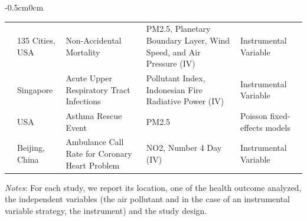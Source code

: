 \begin{table}[]
\begin{adjustwidth}{-0.5cm}{0cm}
\begin{threeparttable}
\begin{tabular}{p{2.5cm}p{3cm}p{7cm}p{7cm}p{4cm}}
\cite{schwartz_national_2018}      & 135 Cities, USA             & Non-Accidental Mortality                                    & PM2.5, Planetary Boundary Layer, Wind Speed, and Air Pressure (IV) & Instrumental Variable                             \\
\rowcolor{Gray}
\cite{sheldon_impact_2017}     & Singapore                   & Acute Upper Respiratory Tract Infections                    & Pollutant Index, Indonesian Fire Radiative Power (IV)                              & Instrumental Variable                             \\
\cite{williams_short-term_2019}       & USA                         & Asthma Rescue Event                                         & PM2.5                                                             & Poisson fixed-effects models                      \\
\rowcolor{Gray}
\cite{zhong2017traffic}         & Beijing, China              & Ambulance Call Rate for Coronary Heart Problem              & NO2, Number 4 Day (IV)                                             & Instrumental Variable                             \\

\bottomrule
\end{tabular}
\begin{tablenotes}
\scriptsize
\item \textit{Notes}: For each study, we report its location, one of the health outcome analyzed, the independent variables (the air pollutant and in the case of an instrumental variable strategy, the instrument) and the study design.
\end{tablenotes}
\end{threeparttable}
\end{adjustwidth}
\end{table}
